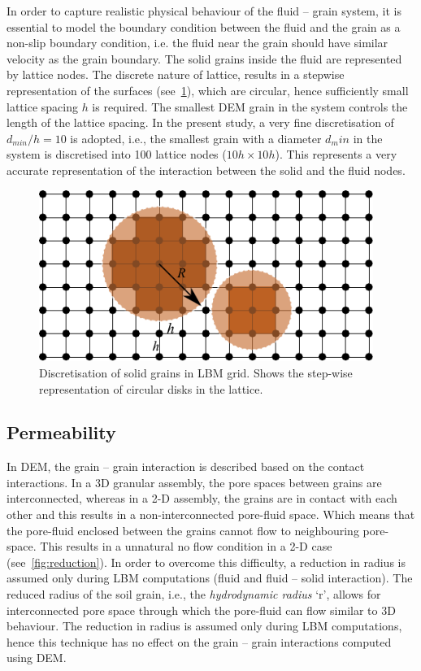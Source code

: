 In order to capture realistic physical behaviour of the fluid – grain system, 
it is essential to model the boundary condition between the fluid and the grain 
as a non-slip boundary condition, i.e. the fluid near the grain should have 
similar velocity as the grain boundary. The solid grains inside the fluid are 
represented by lattice nodes. The discrete nature of lattice, results in a 
stepwise representation of the surfaces (see~\cref{fig:LBM-DEM}), which are 
circular, hence sufficiently small lattice spacing $h$ is required. The 
smallest DEM grain in the system controls the length of the lattice spacing. In 
the present study, a very fine discretisation of $d_{min}/h = 10$ is adopted, 
i.e., the smallest grain with a  diameter $d_min$ in the system is discretised 
into 100 lattice nodes ($ 10h \times 10h$). This represents a very accurate 
representation of the interaction between the solid and the fluid nodes.

\begin{figure}[htpb]
\centering
\includegraphics[width=0.97\textwidth]{LBM-DEM}
\caption{Discretisation of solid grains in LBM grid. Shows the step-wise 
representation of circular disks in the lattice.}
\label{fig:LBM-DEM}
\end{figure}


\subsection{Permeability}

In DEM, the grain – grain interaction is described based on the contact 
interactions. In a 3D granular assembly, the pore spaces between grains are 
interconnected, whereas in a 2-D assembly, the grains are in contact with each 
other and this results in a non-interconnected pore-fluid space. Which means 
that the pore-fluid enclosed between the grains cannot flow to neighbouring 
pore-space.  This results in a unnatural no flow condition in a 2-D case 
(see~\cref{fig:reduction}). In 
order to overcome this difficulty, a 
reduction in radius is assumed only during LBM computations (fluid and fluid – 
solid interaction). The reduced radius of the soil grain, i.e., the 
\textit{hydrodynamic radius} `r', allows for interconnected pore space through 
which the pore-fluid can flow similar to 3D behaviour. The reduction in radius 
is assumed only during LBM computations, hence this technique has no effect on 
the grain – grain interactions computed using DEM. 

